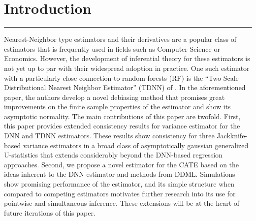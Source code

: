 \section{Introduction}
\hrule
Nearest-Neighbor type estimators and their derivatives are a popular class of estimators that is frequently used in fields such as Computer Science or Economics.
However, the development of inferential theory for these estimators is not yet up to par with their widespread adoption in practice.
One such estimator with a particularly close connection to random forests (RF) is the ``Two-Scale Distributional Nearest Neighbor Estimator'' (TDNN) of \citet{demirkaya_optimal_2024}.
In the aforementioned paper, the authors develop a novel debiasing method that promises great improvements on the finite sample properties of the estimator and show its asymptotic normality.
The main contributions of this paper are twofold.
First, this paper provides extended consistency results for variance estimator for the DNN and TDNN estimators.
These results show consistency for three Jackknife-based variance estimators in a broad class of asymptotically gaussian generalized U-statistics that extends considerably beyond the DNN-based regression approaches.
Second, we propose a novel estimator for the CATE based on the ideas inherent to the DNN estimator and methods from DDML.
Simulations show promising performance of the estimator, and its simple structure when compared to competing estimators motivates further research into its use for pointwise and simultaneous inference.
These extensions will be at the heart of future iterations of this paper.

